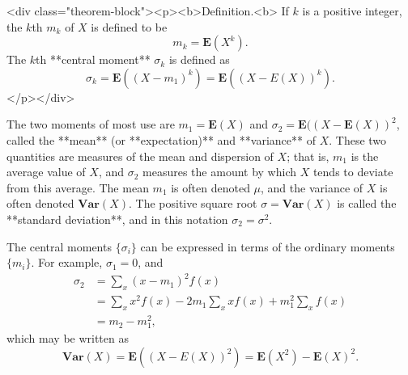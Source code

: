 <div class="theorem-block"><p><b>Definition.<b> 
If $k$ is a positive integer, the $k$th  $m_k$ of $X$ is defined to be 
$$\begin{equation}
    m_k = \mathbf{E}(X^k).
\end{equation}$$
The $k$th **central moment** $\sigma_k$ is defined as
$$\begin{equation}
    \sigma_k = \mathbf{E}\left( (X-m_1)^k \right) = \mathbf{E}\left( (X-E(X))^k \right).
\end{equation}$$ 
</p></div>

The two moments of most use are $m_1 = \mathbf{E}(X)$ and $\sigma_2 = \mathbf{E}( (X - \mathbf{E}(X))^2$, called the **mean** (or **expectation)** and **variance** of $X$. These two quantities are measures of the mean and dispersion of $X$; that is, $m_1$ is the average value of $X$, and $\sigma_2$ measures the amount by which $X$ tends to deviate from this average. The mean $m_1$ is often denoted $\mu$, and the variance of $X$ is often denoted $\mathbf{Var}(X)$. The positive square root $\sigma = \mathbf{Var}(X)$ is called the **standard deviation**, and in this notation $\sigma_2 = \sigma^2$. 

The central moments $\{\sigma_i\}$ can be expressed in terms of the ordinary moments $\{m_i\}$. For example, $\sigma_1 = 0$, and 
$$\begin{equation}
    \begin{aligned} 
        \sigma_{2} &=\sum_{x}\left(x-m_{1}\right)^{2} f(x) \\ 
        &=\sum_{x} x^{2} f(x)-2 m_{1} \sum_{x} x f(x)+m_{1}^{2} \sum_{x} f(x) \\ 
        &=m_{2}-m_{1}^{2} ,
    \end{aligned}
\end{equation}$$
which may be written as 
$$$$$$$$\begin{equation}
    \label{eq:4-1}
    \tag{4-1}
    \mathbf{Var}(X) = \mathbf{E}\left( (X-E(X))^2 \right) = \mathbf{E}(X^2) - \mathbf{E}(X)^2.
\end{equation}$$$$$$$$

